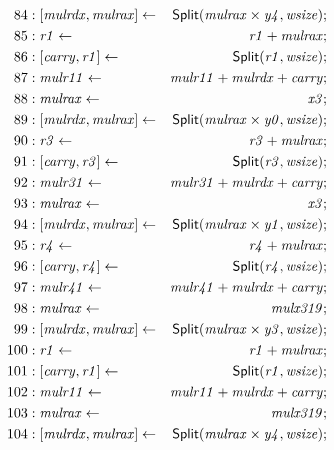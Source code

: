 {\begin{multicols}{2}
\begin{align*}
84 &: \concat{\mathit{mulrdx}}{\mathit{mulrax}} \leftarrow & \dslcode{Split}(\mathit{mulrax} \times \mathit{y4}, \mathit{wsize}); \\
85 &: \mathit{r1} \leftarrow & \mathit{r1} + \mathit{mulrax}; \\
86 &: \concat{\mathit{carry}}{\mathit{r1}} \leftarrow & \dslcode{Split}(\mathit{r1}, \mathit{wsize}); \\
87 &: \mathit{mulr11} \leftarrow & \mathit{mulr11} + \mathit{mulrdx} + \mathit{carry}; \\
88 &: \mathit{mulrax} \leftarrow & \mathit{x3}; \\
89 &: \concat{\mathit{mulrdx}}{\mathit{mulrax}} \leftarrow & \dslcode{Split}(\mathit{mulrax} \times \mathit{y0}, \mathit{wsize}); \\
90 &: \mathit{r3} \leftarrow & \mathit{r3} + \mathit{mulrax}; \\
91 &: \concat{\mathit{carry}}{\mathit{r3}} \leftarrow & \dslcode{Split}(\mathit{r3}, \mathit{wsize}); \\
92 &: \mathit{mulr31} \leftarrow & \mathit{mulr31} + \mathit{mulrdx} + \mathit{carry}; \\
93 &: \mathit{mulrax} \leftarrow & \mathit{x3}; \\
94 &: \concat{\mathit{mulrdx}}{\mathit{mulrax}} \leftarrow & \dslcode{Split}(\mathit{mulrax} \times \mathit{y1}, \mathit{wsize}); \\
95 &: \mathit{r4} \leftarrow & \mathit{r4} + \mathit{mulrax}; \\
96 &: \concat{\mathit{carry}}{\mathit{r4}} \leftarrow & \dslcode{Split}(\mathit{r4}, \mathit{wsize}); \\
97 &: \mathit{mulr41} \leftarrow & \mathit{mulr41} + \mathit{mulrdx} + \mathit{carry}; \\
98 &: \mathit{mulrax} \leftarrow & \mathit{mulx319}; \\
99 &: \concat{\mathit{mulrdx}}{\mathit{mulrax}} \leftarrow & \dslcode{Split}(\mathit{mulrax} \times \mathit{y3}, \mathit{wsize}); \\
100 &: \mathit{r1} \leftarrow & \mathit{r1} + \mathit{mulrax}; \\
101 &: \concat{\mathit{carry}}{\mathit{r1}} \leftarrow & \dslcode{Split}(\mathit{r1}, \mathit{wsize}); \\
102 &: \mathit{mulr11} \leftarrow & \mathit{mulr11} + \mathit{mulrdx} + \mathit{carry}; \\
103 &: \mathit{mulrax} \leftarrow & \mathit{mulx319}; \\
104 &: \concat{\mathit{mulrdx}}{\mathit{mulrax}} \leftarrow & \dslcode{Split}(\mathit{mulrax} \times \mathit{y4}, \mathit{wsize}); \\

\end{align*}
\end{multicols}}

